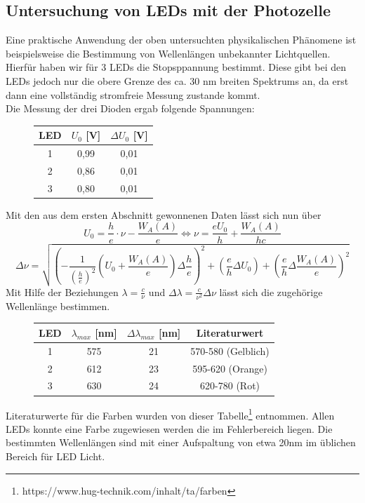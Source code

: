 \documentclass{scrartcl}
\begin{document}
	\subsection{Untersuchung von LEDs mit der Photozelle}
		Eine praktische Anwendung der oben untersuchten physikalischen Phänomene ist beispielsweise
		die Bestimmung von Wellenlängen unbekannter Lichtquellen. Hierfür haben wir für 3 LEDs die 
		Stopsppannung bestimmt. Diese gibt bei den LEDs jedoch nur die obere Grenze des ca. 30 nm breiten Spektrums an,
		da erst dann eine vollständig stromfreie Messung zustande kommt.\\
		Die Messung der drei Dioden ergab folgende Spannungen:
		\begin{figure}[H]
			\centering
			\begin{tabular}{|c|c|c|}
				\hline
				LED & $U_0$ [V] & $\Delta U_0$ [V] \\
				\hline
				1 & 0,99 & 0,01\\
				2 & 0,86 & 0,01\\
				3 & 0,80 & 0,01\\
				\hline
			\end{tabular}
		\end{figure}
		Mit den aus dem ersten Abschnitt gewonnenen Daten lässt sich nun über
		\begin{equation}
			U_0 = \frac{h}{e}\cdot \nu - \frac{W_A(A)}{e} 
			\Leftrightarrow 
			\nu = \frac{eU_0}{h} + \frac{W_A(A)}{hc}
		\end{equation}
		\begin{equation}
			\Delta \nu = \sqrt{(-\frac{1}{(\frac{h}{e})^2} (U_0 + \frac{W_A(A)}{e})\Delta \frac{h}{e}
			)^2 + (\frac{e}{h}\Delta U_0) + (\frac{e}{h} \Delta \frac{W_A(A)}{e})^2}
		\end{equation}
		Mit Hilfe der Beziehungen $ \lambda = \frac{c}{\nu}$ und $\Delta \lambda = \frac{c}{\nu^2} \Delta \nu$
		lässt sich die zugehörige Wellenlänge bestimmen.
		
		\begin{figure}[H]
			\centering
			\begin{tabular}{|c|c|c|c|}
				\hline
				LED & $\lambda_{max}$ [nm] & $\Delta\lambda_{max}$ [nm] & Literaturwert \\
				\hline
				1 & 575 & 21 & 570-580 (Gelblich)\\
				2 & 612 & 23 & 595-620 (Orange)\\
				3 & 630 & 24 & 620-780 (Rot)\\
				\hline
			\end{tabular}
		\end{figure}
		Literaturwerte für die Farben wurden von dieser Tabelle\footnote{https://www.hug-technik.com/inhalt/ta/farben} entnommen.
		Allen LEDs konnte eine Farbe zugewiesen werden die im Fehlerbereich liegen. Die bestimmten Wellenlängen sind mit einer 
		Aufspaltung von etwa 20nm im üblichen Bereich für LED Licht.  
\end{document}
